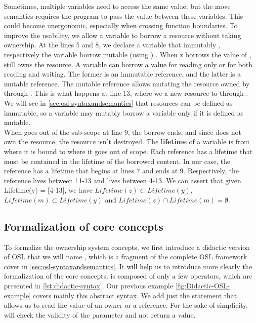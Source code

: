 Sometimes, multiple variables need to access the same value, but the move semantics requires the program to pass the value between these variables. This could become unergonomic, especially when crossing function boundaries. To improve the usability, we allow a variable to borrow a resource without taking ownership. At the lines 5 and 8, we declare a variable  that  immutably , respectively the variable  borrow mutable (using ) .
When z borrows the value of ,  still owns the resource. A variable can borrow a value for reading only or for both reading and writing. The former is an immutable reference, and the latter is a mutable reference. The mutable reference  allows mutating the resource owned by  through . This is what happens at line 13, where we  a new resource to  through . We will see in \autoref{sec:osl-syntaxandsemantics} that resources can be defined as immutable, so a variable may mutably borrow a variable only if it is defined as mutable.\\

When  goes out of the sub-scope at line 9, the borrow ends, and since  does not own the resource, the resource isn't destroyed. The \textbf{lifetime} of a variable is from where it is bound to where it goes out of scope. Each reference has a lifetime that must be contained in the lifetime of the borrowed content. In our case, the reference  has a lifetime that begins at lines 7 and ends at 9. Respectively, the reference  lives between 11-13 and  lives between 4-13. We can assert that given Lifetime(y) = [4-13], we have $Lifetime(z) \subset Lifetime(y)$, $Lifetime(m) \subset Lifetime(y)$ and $Lifetime(z)  \cap Lifetime(m) = \emptyset$.


\subsection{Formalization of  core concepts}
\label{ssec:Formalisation of core concepts}

To formalize the ownership system concepts, we first introduce a didactic version of OSL that we will name \osld, which is a fragment of the complete OSL framework cover in \autoref{sec:osl-syntaxandsemantics}. It will help us to introduce more clearly the formalization of the core concepts.
\osld is composed of only a few operators, which are presented in \autoref{lst:didactic-syntax}. Our previous example \autoref{fig:Didactic-OSL-example} covers mainly this abstract syntax. We add just the statement  that allows us to read the value of an owner or a reference. For the sake of simplicity,  will check the validity of the parameter and not return a value.

